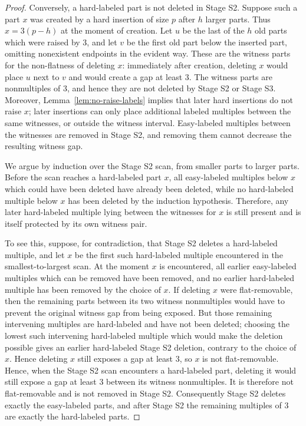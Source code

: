\documentclass[11pt]{amsart}
\theoremstyle{definition}
\theoremstyle{remark}
\begin{document}
\begin{proof}
Conversely, a hard-labeled part is not deleted in Stage S2.  Suppose such a
part $x$ was created by a hard insertion of size $p$ after $h$ larger parts.
Thus $x=3(p-h)$ at the moment of creation.  Let $u$ be the last of the $h$
old parts which were raised by $3$, and let $v$ be the first old part below
the inserted part, omitting nonexistent endpoints in the evident way.  These
are the witness parts for the non-flatness of deleting $x$: immediately after
creation, deleting $x$ would place $u$ next to $v$ and would create a gap at
least $3$.  The witness parts are nonmultiples of $3$, and hence they are not
deleted by Stage S2 or Stage S3.  Moreover, Lemma~\ref{lem:no-raise-labels}
implies that later hard insertions do not raise $x$; later insertions can only
place additional labeled multiples between the same witnesses, or outside the
witness interval.  Easy-labeled multiples between the witnesses are removed
in Stage S2, and removing them cannot decrease the resulting witness gap.

We argue by induction over the Stage S2 scan, from smaller parts to larger
parts.  Before the scan reaches a hard-labeled part $x$, all easy-labeled
multiples below $x$ which could have been deleted have already been deleted,
while no hard-labeled multiple below $x$ has been deleted by the induction
hypothesis.  Therefore, any later hard-labeled multiple lying between the
witnesses for $x$ is still present and is itself protected by its own witness
pair.  

To see this, suppose, for contradiction, that Stage S2 deletes a hard-labeled multiple, and
let $x$ be the first such hard-labeled multiple encountered in the
smallest-to-largest scan.  At the moment $x$ is encountered, all earlier
easy-labeled multiples which can be removed have been removed, and no earlier
hard-labeled multiple has been removed by the choice of $x$.  If deleting $x$
were flat-removable, then the remaining parts between its two witness
nonmultiples would have to prevent the original witness gap from being exposed.
But those remaining intervening multiples are hard-labeled and have not been
deleted; choosing the lowest such intervening hard-labeled multiple which would
make the deletion possible gives an earlier hard-labeled Stage S2 deletion,
contrary to the choice of $x$.  Hence deleting $x$ still exposes a gap at least
$3$, so $x$ is not flat-removable.
 Hence, when the Stage
S2 scan encounters a hard-labeled part, deleting it would still expose a gap
at least $3$ between its witness nonmultiples.  It is therefore not
flat-removable and is not removed in Stage S2.  Consequently Stage S2 deletes
exactly the easy-labeled parts, and after Stage S2 the remaining multiples of
$3$ are exactly the hard-labeled parts.


\end{proof}
\end{document}
